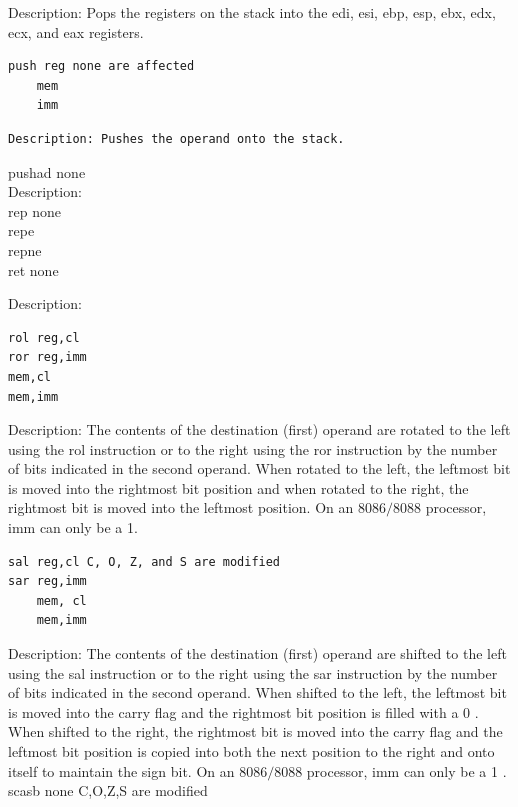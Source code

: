 \documentclass[10pt]{article}
\begin{document}
Description: Pops the registers on the stack into the edi, esi, ebp, esp, ebx, edx, ecx, and eax registers.

\begin{verbatim}
push reg none are affected
    mem
    imm
\end{verbatim}

\begin{verbatim}
Description: Pushes the operand onto the stack.
\end{verbatim}

pushad none\\
Description:\\
rep none\\
repe\\
repne\\
ret none

Description:

\begin{verbatim}
rol reg,cl
ror reg,imm
mem,cl
mem,imm
\end{verbatim}

Description: The contents of the destination (first) operand are rotated to the left using the rol instruction or to the right using the ror instruction by the number of bits indicated in the second operand. When rotated to the left, the leftmost bit is moved into the rightmost bit position and when rotated to the right, the rightmost bit is moved into the leftmost position. On an $8086 / 8088$ processor, imm can only be a 1.

\begin{verbatim}
sal reg,cl C, O, Z, and S are modified
sar reg,imm
    mem, cl
    mem,imm
\end{verbatim}

Description: The contents of the destination (first) operand are shifted to the left using the sal instruction or to the right using the sar instruction by the number of bits indicated in the second operand. When shifted to the left, the leftmost bit is moved into the carry flag and the rightmost bit position is filled with a 0 . When shifted to the right, the rightmost bit is moved into the carry flag and the leftmost bit position is copied into both the next position to the right and onto itself to maintain the sign bit. On an $8086 / 8088$ processor, imm can only be a 1 .\\
scasb none C,O,Z,S are modified
\end{document}
